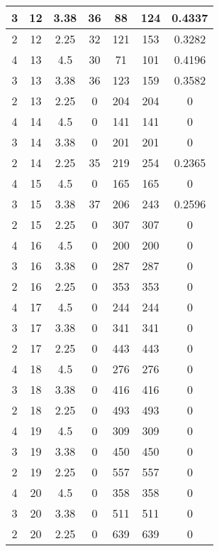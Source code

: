 \documentclass[letterpaper, 12pt]{article}
\begin{document}
\begin{longtable}{|c|c|c|c|c|c|c|}
\hline
3 & 12 & 3.38 & 36 & 88 & 124 & 0.4337 \\
\hline
2 & 12 & 2.25 & 32 & 121 & 153 & 0.3282 \\
\hline
4 & 13 & 4.5 & 30 & 71 & 101 & 0.4196 \\
\hline
3 & 13 & 3.38 & 36 & 123 & 159 & 0.3582 \\
\hline
2 & 13 & 2.25 & 0 & 204 & 204 & 0 \\
\hline
4 & 14 & 4.5 & 0 & 141 & 141 & 0 \\
\hline
3 & 14 & 3.38 & 0 & 201 & 201 & 0 \\
\hline
2 & 14 & 2.25 & 35 & 219 & 254 & 0.2365 \\
\hline
4 & 15 & 4.5 & 0 & 165 & 165 & 0 \\
\hline
3 & 15 & 3.38 & 37 & 206 & 243 & 0.2596 \\
\hline
2 & 15 & 2.25 & 0 & 307 & 307 & 0 \\
\hline
4 & 16 & 4.5 & 0 & 200 & 200 & 0 \\
\hline
3 & 16 & 3.38 & 0 & 287 & 287 & 0 \\
\hline
2 & 16 & 2.25 & 0 & 353 & 353 & 0 \\
\hline
4 & 17 & 4.5 & 0 & 244 & 244 & 0 \\
\hline
3 & 17 & 3.38 & 0 & 341 & 341 & 0 \\
\hline
2 & 17 & 2.25 & 0 & 443 & 443 & 0 \\
\hline
4 & 18 & 4.5 & 0 & 276 & 276 & 0 \\
\hline
3 & 18 & 3.38 & 0 & 416 & 416 & 0 \\
\hline
2 & 18 & 2.25 & 0 & 493 & 493 & 0 \\
\hline
4 & 19 & 4.5 & 0 & 309 & 309 & 0 \\
\hline
3 & 19 & 3.38 & 0 & 450 & 450 & 0 \\
\hline
2 & 19 & 2.25 & 0 & 557 & 557 & 0 \\
\hline
4 & 20 & 4.5 & 0 & 358 & 358 & 0 \\
\hline
3 & 20 & 3.38 & 0 & 511 & 511 & 0 \\
\hline
2 & 20 & 2.25 & 0 & 639 & 639 & 0 \\
\hline
\end{longtable}
\end{document}
